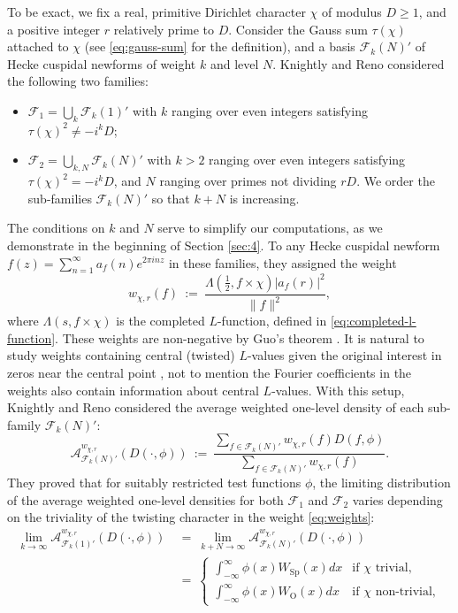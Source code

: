 \documentclass[12pt, reqno,oneside]{amsart}
\theoremstyle{plain}
\theoremstyle{definition}
\theoremstyle{remark}
\theoremstyle{plain}
\numberwithin{equation}{section}
\begin{document}
To be exact, we fix a real, primitive Dirichlet character $\chi$ of modulus $D\geq1$, and a positive integer $r$ relatively prime to $D$. Consider the Gauss sum $\tau(\chi)$ attached to $\chi$ (see \eqref{eq:gauss-sum} for the definition), and a basis $\mathcal{F}_k(N)'$ of Hecke cuspidal newforms of weight $k$ and level $N$. Knightly and Reno considered the following two families:
\begin{itemize}
    \item $\mathcal{F}_1=\bigcup_k \mathcal{F}_k(1)'$ with $k$ ranging over even integers satisfying $\tau(\chi)^2\neq-i^kD$;
    \item $\mathcal{F}_2=\bigcup_{k,N}\mathcal{F}_k(N)'$ with $k>2$ ranging over even integers satisfying $\tau(\chi)^2=-i^kD$, and $N$ ranging over primes not dividing $rD$. We order the sub-families $\mathcal{F}_k(N)'$ so that $k+N$ is increasing. 
\end{itemize}
The conditions on $k$ and $N$ serve to simplify our computations, as we demonstrate in the beginning of Section \ref{sec:4}. To any Hecke cuspidal newform $f(z)=\sum_{n=1}^\infty a_f(n)e^{2 \pi inz}$ in these families, they assigned the weight 
\begin{equation}\label{eq:weights}
  w_{\chi,r}(f) \ := \ \frac{\Lambda\left(\frac{1}{2},f\times\chi\right)|a_f(r)|^2}{\lVert f\rVert^2},
\end{equation}
where $\Lambda\left(s,f\times\chi\right)$ is the completed $L$-function, defined in \eqref{eq:completed-l-function}. These weights are non-negative by Guo's theorem \cite{Guo96}. It is natural to study weights containing central (twisted) $L$-values given the original interest in zeros near the central point \cite{Faz24}, not to mention the Fourier coefficients in the weights also contain information about central $L$-values. With this setup, Knightly and Reno considered the average weighted one-level density of each sub-family $\mathcal{F}_k(N)'$:
\begin{equation}\label{eq:average-density}
\mathcal{A}^{w_{\chi,r}}_{\mathcal{F}_k(N)'}(D(\cdot,\phi)) \ := \ \frac{\sum_{f\in\mathcal{F}_k(N)'}w_{\chi,r}(f)D(f,\phi)}{\sum_{f\in\mathcal{F}_k(N)'}w_{\chi,r}(f)}.
\end{equation}
They proved that for suitably restricted test functions $\phi$, the limiting distribution of the average weighted one-level densities for both $\mathcal{F}_1$ and $\mathcal{F}_2$ varies depending on the triviality of the twisting character in the weight \eqref{eq:weights}:
\begin{align}\label{eq:knightly-reno}\nonumber
\lim_{k\to\infty}\mathcal{A}^{w_{\chi,r}}_{\mathcal{F}_k(1)'}\left(D(\cdot,\phi)\right)
\ &= \ \lim_{k+N\to\infty}\mathcal{A}^{w_{\chi,r}}_{\mathcal{F}_k(N)'}\left(D(\cdot,\phi)\right) \\ & = \  \begin{cases}
    \int_{-\infty}^\infty\phi(x)W_\text{Sp}(x)dx & \text{if }\chi\text{ trivial}, \\ 
    \int_{-\infty}^\infty\phi(x)W_\text{O}(x)dx & \text{if }\chi\text{ non-trivial},
\end{cases}
\end{align}
\end{document}
